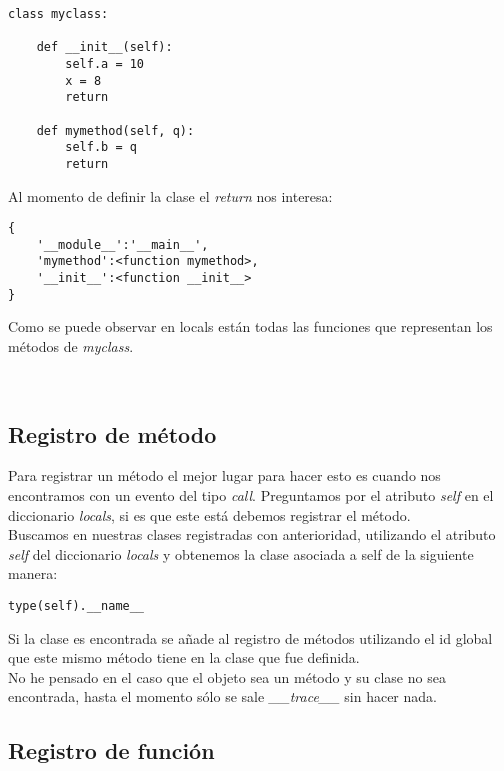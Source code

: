 \documentclass[10pt,a4paper]{article}
\begin{document}
\begin{minipage}{5.5cm}
\begin{verbatim}
class myclass:

    def __init__(self):
        self.a = 10
        x = 8
        return

    def mymethod(self, q):
        self.b = q
        return
\end{verbatim}
\end{minipage}
\begin{minipage}{5.5cm}
  Al momento de definir la clase el \textit{return} nos interesa:
\begin{verbatim}
{
    '__module__':'__main__',
    'mymethod':<function mymethod>,
    '__init__':<function __init__>
}
\end{verbatim}

Como se puede observar en locals están todas las funciones que representan los métodos de \textit{myclass}.
\end{minipage}
\\

\subsection{Registro de método}

Para registrar un método el mejor lugar para hacer esto es cuando nos encontramos con un evento del tipo \textit{call}.  Preguntamos por el atributo \textit{self} en el diccionario \textit{locals}, si es que este está debemos registrar el método.\\

Buscamos en nuestras clases registradas con anterioridad, utilizando el atributo \textit{self} del diccionario \textit{locals} y obtenemos la clase asociada a self de la siguiente manera:

\begin{verbatim}
type(self).__name__
\end{verbatim}

Si la clase es encontrada se añade al registro de métodos utilizando el id global que este mismo método tiene en la clase que fue definida.\\

No he pensado en el caso que el objeto sea un método y su clase no sea encontrada, hasta el momento sólo se sale \textit{\_\_trace\_\_} sin hacer nada.

\subsection{Registro de función}
\end{document}
